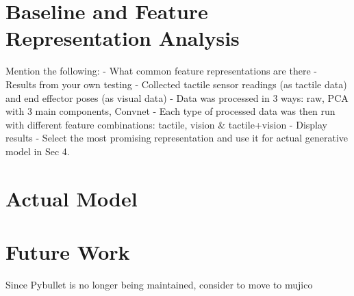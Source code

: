 \documentclass[12pt, a4paper]{report}
\theoremstyle{definition}
\begin{document}
\chapter{Baseline and Feature Representation Analysis}
\label{chap:4}
Mention the following:
- What common feature representations are there
- Results from your own testing
    - Collected tactile sensor readings (as tactile data) and end effector poses (as visual data)
    - Data was processed in 3 ways: raw, PCA with 3 main components, Convnet
    - Each type of processed data was then run with different feature combinations: tactile, vision \& tactile+vision
    - Display results
- Select the most promising representation and use it for actual generative model in Sec 4.


\chapter{Actual Model}
\label{chap:5}



\chapter{Future Work}
\label{chap:6}
Since Pybullet is no longer being maintained, consider to move to mujico



\appendix
\end{document}
